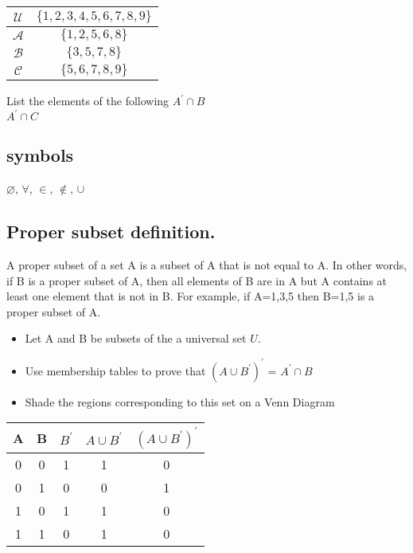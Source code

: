 \begin{center}
\begin{tabular}{|c|c|} \hline
$\mathcal{U}$ & $\{1,2,3,4,5,6,7,8,9\}$ \\ \hline
$\mathcal{A}$ & $\{1,2,5,6,8\}$ \\ \hline
$\mathcal{B}$ & $\{3,5,7,8\}$ \\ \hline
$\mathcal{C}$ & $\{5,6,7,8,9\}$ \\ \hline
\end{tabular}
\end{center}

List the elements of the following
$A^{\prime} \cap B $\\
$A^{\prime} \cap C $\\



\subsection*{symbols}
$\varnothing$,
$\forall$,
$\in$,
$\notin$,
$\cup$

\subsection{Proper subset definition.} 
A proper subset of a set A is a subset of A that is not equal to A. In other words, if B is a proper subset of A, then all elements of B are in A but A contains at least one element that is not in B. For example, if A={1,3,5} then B={1,5} is a proper subset of A.







\begin{itemize}
\item Let A and B be subsets of the a universal set $U$.
\item Use membership tables to prove that $(A \cup B^{\prime})^{\prime}$ = $A^{\prime} \cap B$
\item Shade the regions corresponding to this set on a Venn Diagram
\end{itemize}

\begin{tabular}{|c|c|| c | c| c|}
A&B&$B^{\prime}$&$A \cup B^{\prime}$&$(A \cup B^{\prime})^{\prime}$\\ \hline
0&0&1&1&0\\
0&1&0&0&1\\
1&0&1&1&0\\
1&1&0&1&0\\
\end{tabular}

